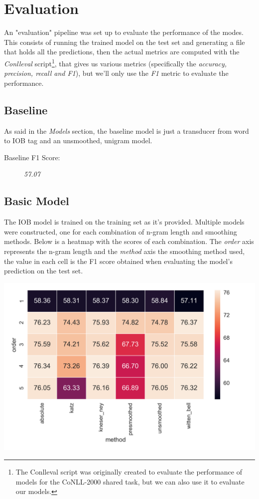 \documentclass[11pt,a4paper]{article}
\begin{document}
\section{Evaluation}
	
	An "evaluation" pipeline was set up to evaluate the performance of the modes. This consists of running the trained model on the test set and generating a file that holds all the predictions, then the actual metrics are computed with the \textit{Conlleval} script\footnote{The Conlleval script was originally created to evaluate the performance of models for the CoNLL-2000 shared task, but we can also use it to evaluate our models.}, that gives us various metrics (specifically the \textit{accuracy, precision, recall and F1}), but we'll only use the \textit{F1} metric to evaluate the performance.

\subsection{Baseline}

	As said in the \textit{Models} section, the baseline model is just a transducer from word to IOB tag and an unsmoothed, unigram model.
	
	\begin{description}
		\item[Baseline F1 Score:] \textit{57.07}
	\end{description}
	
\subsection{Basic Model}
	
	The IOB model is trained on the training set as it's provided. Multiple models were constructed, one for each combination of n-gram length and smoothing methods. Below is a heatmap with the scores of each combination. The \textit{order} axis represents the n-gram length and the \textit{method} axis the smoothing method used, the value in each cell is the F1 score obtained when evaluating the model's prediction on the test set.
	
	\hspace*{-1cm}\includegraphics[scale=0.6]{scores_heatmap_w2iob}
	
\end{document}
